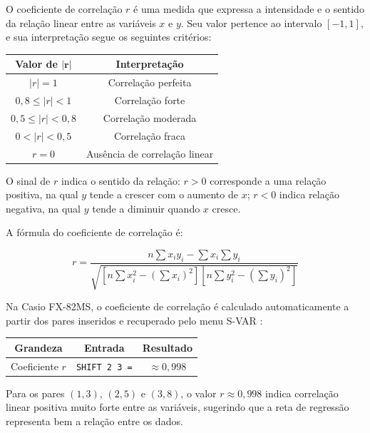 O coeficiente de correlação $r$ é uma medida que expressa a intensidade e o sentido da relação linear entre as variáveis $x$ e $y$. Seu valor pertence ao intervalo $[-1, 1]$, e sua interpretação segue os seguintes critérios:

\begin{table}[H]
    \centering
    \begin{tabular}{|c|c|}
        \hline
        \textbf{Valor de $\boldsymbol{|r|}$} & \textbf{Interpretação} \\ \hline
        $|r| = 1$ & Correlação perfeita \\
        $0{,}8 \leq |r| < 1$ & Correlação forte \\
        $0{,}5 \leq |r| < 0{,}8$ & Correlação moderada \\
        $0 < |r| < 0{,}5$ & Correlação fraca \\
        $r = 0$ & Ausência de correlação linear \\ \hline
    \end{tabular}
\end{table}

O sinal de $r$ indica o sentido da relação: $r > 0$ corresponde a uma relação positiva, na qual $y$ tende a crescer com o aumento de $x$; $r < 0$ indica relação negativa, na qual $y$ tende a diminuir quando $x$ cresce.

A fórmula do coeficiente de correlação é:

\[
    r = \frac{n \sum x_i y_i - \sum x_i \sum y_i} {\sqrt{\left[n \sum x_i^2 - \left(\sum x_i\right)^2\right] \left[n \sum y_i^2 - \left(\sum y_i\right)^2\right]}}
\]

Na Casio FX-82MS, o coeficiente de correlação é calculado automaticamente a partir dos pares inseridos e recuperado pelo menu S-VAR \cite{casio2004}:

\begin{table}[H]
    \centering
    \begin{tabular}{|c|c|c|}
        \hline
        \textbf{Grandeza} & \textbf{Entrada} & \textbf{Resultado} \\ \hline
        Coeficiente $r$ & \texttt{SHIFT 2 3 =} & $\approx 0{,}998$ \\ \hline
    \end{tabular}
\end{table}

Para os pares $(1, 3)$, $(2, 5)$ e $(3, 8)$, o valor $r \approx 0{,}998$ indica correlação linear positiva muito forte entre as variáveis, sugerindo que a reta de regressão representa bem a relação entre os dados.

